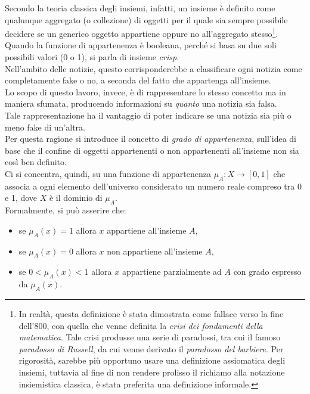 \documentclass[12pt]{report}
\theoremstyle{definition}
\begin{document}
Secondo la teoria classica degli insiemi, infatti, un insieme è definito come qualunque aggregato (o collezione) di oggetti per il quale sia sempre possibile decidere se un generico oggetto appartiene oppure no all'aggregato stesso\footnote{In realtà, questa definizione è stata dimostrata come fallace verso la fine dell'800, con quella che venne definita la \textit{crisi dei fondamenti della matematica}. Tale crisi produsse una serie di paradossi, tra cui il famoso \textit{paradosso di Russell}, da cui venne derivato il \textit{paradosso del barbiere}. Per rigorosità, sarebbe più opportuno usare una definizione assiomatica degli insiemi, tuttavia al fine di non rendere prolisso il richiamo alla notazione insiemistica classica, è stata preferita una definizione informale.}.
\\
Quando la funzione di appartenenza è booleana, perché si basa su due soli possibili valori (0 o 1), si parla di insieme \textit{crisp}.
\\
Nell'ambito delle notizie, questo corrisponderebbe a classificare ogni notizia come completamente fake o no, a seconda del fatto che appartenga all'insieme.
\\
Lo scopo di questo lavoro, invece, è di rappresentare lo stesso concetto ma in maniera sfumata, producendo informazioni su \textit{quanto} una notizia sia falsa.
\\
Tale rappresentazione ha il vantaggio di poter indicare se una notizia sia più o meno fake di un'altra.
\\
Per questa ragione si introduce il concetto di \textit{grado di appartenenza}, sull'idea di base che il confine di oggetti appartenenti o non appartenenti all'insieme non sia così ben definito.
\\
Ci si concentra, quindi, su una funzione di appartenenza $\mu_A: X \rightarrow [0,1]$ che associa a ogni elemento dell'universo considerato un numero reale compreso tra 0 e 1, dove $X$ è il dominio di $\mu_A$.
\\
Formalmente, si può asserire che:
\begin{itemize}
    \item se $\mu_A(x) = 1$ allora $x$ appartiene all'insieme $A$,
    \item se $\mu_A(x) = 0$ allora $x$ non appartiene all'insieme $A$,
    \item se $0 < \mu_A(x) < 1$ allora $x$ appartiene parzialmente ad $A$ con grado espresso da $\mu_A(x)$.
\end{itemize}
\end{document}
